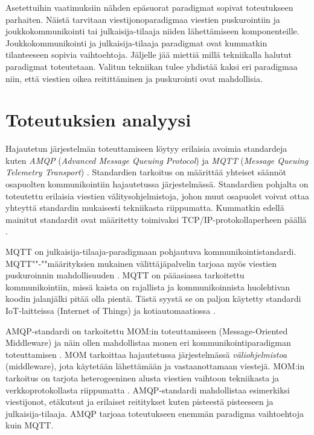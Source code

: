 Asetettuihin vaatimuksiin nähden epäsuorat paradigmat sopivat toteutukseen parhaiten. Näistä tarvitaan viestijonoparadigmaa viestien puskurointiin ja joukkokommunikointi tai julkaisija-tilaaja niiden lähettämiseen komponenteille. Joukkokommunikointi ja julkaisija-tilaaja paradigmat ovat kummatkin tilanteeseen sopivia vaihtoehtoja. Jäljelle jää miettiä millä tekniikalla halutut paradigmat toteutetaan. Valitun tekniikan tulee yhdistää kaksi eri paradigmaa niin, että viestien oikea reitittäminen ja puskurointi ovat mahdollisia.



\section{Toteutuksien analyysi}
Hajautetun järjestelmän toteuttamiseen löytyy erilaisia avoimia standardeja kuten \emph{AMQP} (\emph{Advanced Message Queuing Protocol}) \cite{amqp-homepage} ja \emph{MQTT} (\emph{Message Queuing Telemetry Transport}) \cite{mqtt-homepage}. Standardien tarkoitus on määrittää yhteiset säännöt osapuolten kommunikointiin hajautetussa järjestelmässä. Standardien pohjalta on toteutettu erilaisia viestien välitysohjelmistoja, johon muut osapuolet voivat ottaa yhteyttä standardin mukaisesti tekniikasta riippumatta. Kummatkin edellä mainitut standardit ovat määritetty toimivaksi TCP/IP-protokollaperheen päällä \cite[s.~1]{mqtt-specification} \cite[s.~22]{AMQP-specification}.

MQTT on julkaisija-tilaaja-paradigmaan pohjautuva kommunikointistandardi. MQTT""-""mää\-ri\-tyk\-si\-en mukainen välittäjäpalvelin tarjoaa myös viestien puskuroinnin mahdollisuuden \cite{mqtt-specification}. MQTT on pääasiassa tarkoitettu kommunikointiin, missä kaista on rajallista ja kommunikoinnista huolehtivan koodin jalanjälki pitää olla pientä. Tästä syystä se on paljon käytetty standardi IoT-laitteissa (Internet of Things) ja kotiautomaatiossa \cite[s.~9--11]{mqtt-for-iot}.

AMQP-standardi on tarkoitettu MOM:in toteuttamiseen (Message-Oriented Middleware) ja näin ollen mahdollistaa monen eri kommunikointiparadigman toteuttamisen \cite[s.~6]{AMQP-specification}. MOM tarkoittaa hajautetussa järjestelmässä \emph{väliohjelmistoa} (middleware), jota käytetään lähettämään ja vastaanottamaan viestejä. MOM:in tarkoitus on tarjota heterogeeninen alusta viestien vaihtoon tekniikasta ja verkkoprotokollasta riippumatta \cite{mom}. AMQP-standardi mahdollistaa esimerkiksi viestijonot, etäkutsut ja erilaiset reititykset kuten pisteestä pisteeseen ja julkaisija-tilaaja. AMQP tarjoaa toteutukseen enemmän paradigma vaihtoehtoja kuin MQTT.

